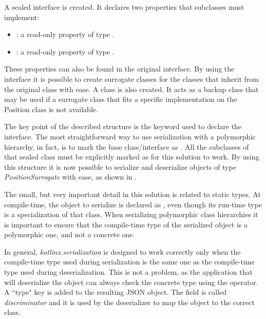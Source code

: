 

A sealed interface  is created. It declares two properties that subclasses must implement:
\begin{itemize}
	\item {}: a read-only property of type .
	\item {}: a read-only property of type .
\end{itemize}
These properties can also be found in the original  interface. By using the  interface it is possible to create surrogate classes for the classes that inherit from the original  class with ease. A  class is also created. It acts as a backup class that may be used if a surrogate class that fits a specific implementation on the Position class is not available.\newline

The key point of the described structure is the  keyword used to declare the  interface.
The most straightforward way to use serialization with a polymorphic hierarchy, in fact, is to mark the base class/interface as . All the subclasses of that sealed class must be explicitly marked as  for this solution to work. By using this structure it is now possible to serialize and deserialize objects of type \textit{PositionSurrogate} with ease, as shown in .\newline

The small, but very important detail in this solution is related to static types. At compile-time, the object to serialize is declared as , even though its run-time type is a specialization of that class. When serializing polymorphic class hierarchies it is important to ensure that the compile-time type of the serialized object is a polymorphic one, and not a concrete one.\newline

In general, \textit{kotlinx.serialization} is designed to work correctly only when the compile-time type used during serialization is the same one as the compile-time type used during deserialization. This is not a problem, as the application that will deserialize the  object can always check the concrete type using the  operator. A ``type" key is added to the resulting JSON object. The field is called \textit{discriminator} and it is used by the deserializer to map the object to the correct class.\newline

